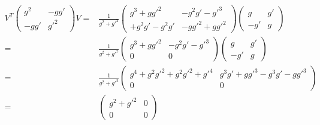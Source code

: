 \begin{align}
  V^T
  \begin{pmatrix}
    g^2&-gg'\\
    -gg'&{g'}^2
  \end{pmatrix}V=&\frac{1}{g^2+{g'}^2}
  \begin{pmatrix}
    g^3+g{g'}^2 & -g^2g'-{g'}^3\\
+g^2g'-g^2g'    &-g{g'}^2+g{g'}^2
  \end{pmatrix}
\begin{pmatrix}
    g   & g'\\
    -g' & g
  \end{pmatrix}\nonumber\\
=&\frac{1}{g^2+{g'}^2}
  \begin{pmatrix}
    g^3+g{g'}^2 & -g^2g'-{g'}^3\\
    0   &0
  \end{pmatrix}
\begin{pmatrix}
    g   & g'\\
    -g' & g
  \end{pmatrix}\nonumber\\
=&\frac{1}{g^2+{g'}^2}
  \begin{pmatrix}
    g^4+g^2{g'}^2+g^2{g'}^2+{g'}^4 & g^3g'+g{g'}^3-g^3g'-g{g'}^3\\
    0    &0
  \end{pmatrix}\nonumber\\
=&\begin{pmatrix}
    g^2+{g'}^2 & 0\\
    0    &0
  \end{pmatrix}
\end{align}


